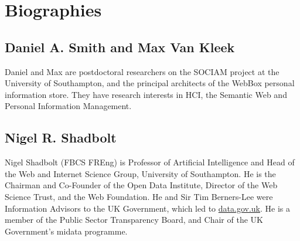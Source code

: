 \documentclass{chi-ext}
\begin{document}






\section{Biographies}

\subsection{Daniel A. Smith and Max Van Kleek}

Daniel and Max are postdoctoral researchers on the SOCIAM project at the University of Southampton, and the principal architects of the WebBox
personal information store. They have research interests in HCI, the Semantic Web and Personal Information Management.


\subsection{Nigel R. Shadbolt}

Nigel Shadbolt (FBCS FREng) is Professor of Artificial Intelligence and Head of the Web and Internet Science Group, University of Southampton. He is the Chairman and Co-Founder of the Open Data Institute, Director of the Web Science Trust, and the Web Foundation.  He and Sir Tim Berners-Lee were Information Advisors to the UK Government, which led to \url{data.gov.uk}. He is a member of the Public Sector Transparency Board, and Chair of the UK Government's midata programme.



\end{document}
